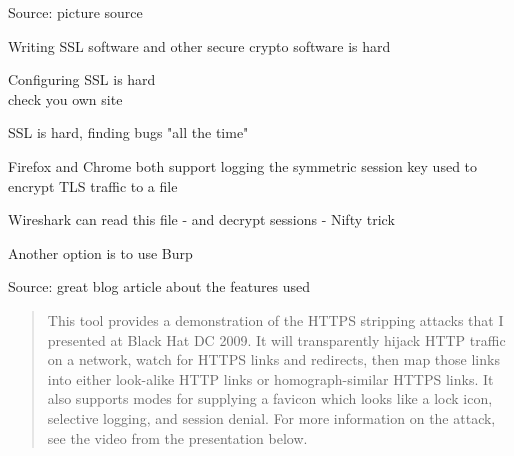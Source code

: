 \documentclass[Screen16to9,17pt]{foils}
\begin{document}

Source: picture source\\ {\footnotesize{}}
\begin{list2}
\item Writing SSL software and other secure crypto software is hard
\item Configuring SSL is hard\\
check you own site 
\item SSL is hard, finding bugs "all the time"
\end{list2}





\begin{list2}
\item  Firefox and Chrome both support logging the symmetric session key used to encrypt TLS traffic to a file
\item Wireshark can read this file - and decrypt sessions - Nifty trick
\item Another option is to use Burp
\end{list2}


Source: great blog article about the features used\\
{\tiny{}}



\begin{quote}
This tool provides a demonstration of the HTTPS stripping attacks that I presented at Black Hat DC 2009. It will transparently hijack HTTP traffic on a network, watch for HTTPS links and redirects, then map those links into either look-alike HTTP links or homograph-similar HTTPS links. It also supports modes for supplying a favicon which looks like a lock icon, selective logging, and session denial. For more information on the attack, see the video from the presentation below.
\end{quote}

\end{document}
